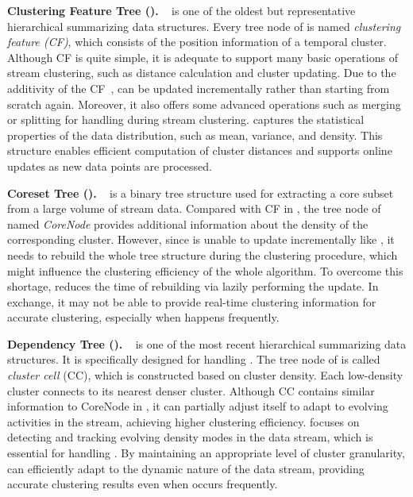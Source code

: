 \textbf{Clustering Feature Tree (\CFT).}
\label{subsec:cf-tree}
\CFT~\cite{BIRCH:96} is one of the oldest but representative hierarchical summarizing data structures. Every tree node of \CFT is named \emph{clustering feature (CF)}, which consists of the position information of a temporal cluster. Although CF is quite simple, it is adequate to support many basic operations of stream clustering, such as distance calculation and cluster updating. Due to the additivity of the CF~\cite{BIRCH:96}, \CFT can be updated incrementally rather than starting from scratch again. Moreover, it also offers some advanced operations such as merging or splitting for handling \cef during stream clustering. \CFT captures the statistical properties of the data distribution, such as mean, variance, and density. This structure enables efficient computation of cluster distances and supports online updates as new data points are processed.

\textbf{Coreset Tree (\CoreT).}
\label{subsec:CT}
\CoreT~\cite{StreamKM++:12} is a binary tree structure used for extracting a core subset from a large volume of stream data. Compared with CF in \CFT, the tree node of \CoreT named \emph{CoreNode} provides additional information about the density of the corresponding cluster. However, since \CoreT is unable to update incrementally like \CFT, it needs to rebuild the whole tree structure during the clustering procedure, which might influence the clustering efficiency of the whole algorithm. To overcome this shortage, \CoreT reduces the time of rebuilding via lazily performing the update. In exchange, it may not be able to provide real-time clustering information for accurate clustering, especially when \cef happens frequently.

\textbf{Dependency Tree (\DPT).}
\label{subsec:DPT}
\DPT~\cite{EDMStream:17} is one of the most recent hierarchical summarizing data structures. It is specifically designed for handling \cef. The tree node of \DPT is called \emph{cluster cell} (CC), which is constructed based on cluster density. Each low-density cluster connects to its nearest denser cluster. Although CC contains similar information to CoreNode in \CoreT, it can partially adjust itself to adapt to evolving activities in the stream, achieving higher clustering efficiency.
\DPT focuses on detecting and tracking evolving density modes in the data stream, which is essential for handling \cef. By maintaining an appropriate level of cluster granularity, \DPT can efficiently adapt to the dynamic nature of the data stream, providing accurate clustering results even when \cef occurs frequently.

